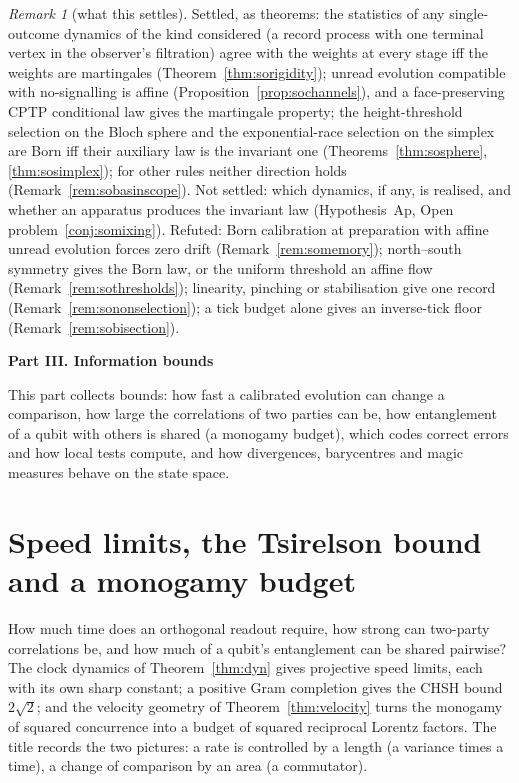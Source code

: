 \documentclass[aps,pra,onecolumn,superscriptaddress,nofootinbib,10pt]{revtex4-2}
\theoremstyle{definition}
\theoremstyle{remark}
\newtheorem{remark}[theorem]{Remark}
\newcommand{\paperpart}[1]{\par\bigskip\begin{center}\large\bfseries #1\end{center}\par\medskip}
\begin{document}
\begin{remark}[what this settles]\label{rem:sosettles}
Settled, as theorems: the statistics of any single-outcome dynamics of the kind considered (a record
process with one terminal vertex in the observer's filtration) agree with the
weights at every stage iff the weights are martingales (Theorem~\ref{thm:sorigidity}); unread evolution compatible
with no-signalling is affine (Proposition~\ref{prop:sochannels}), and a face-preserving CPTP conditional law gives the
martingale property; the height-threshold selection on the Bloch sphere and the exponential-race selection on the
simplex are Born iff their auxiliary law is the invariant one (Theorems~\ref{thm:sosphere}, \ref{thm:sosimplex}); for
other rules neither direction holds (Remark~\ref{rem:sobasinscope}).  Not settled: which dynamics, if any, is realised, and whether an apparatus produces the invariant law (Hypothesis~Ap, Open problem~\ref{conj:somixing}).
Refuted: Born calibration at preparation with affine unread evolution forces zero drift
(Remark~\ref{rem:somemory}); north--south symmetry gives the Born law, or the uniform threshold an affine flow
(Remark~\ref{rem:sothresholds}); linearity, pinching or stabilisation give one record (Remark~\ref{rem:sononselection}); a tick
budget alone gives an inverse-tick floor (Remark~\ref{rem:sobisection}).
\end{remark}


\paperpart{Part III.  Information bounds}
\noindent This part collects bounds: how fast a calibrated evolution can change a comparison, how large the
correlations of two parties can be, how entanglement of a qubit with others is shared (a monogamy budget),
which codes correct errors and how local tests compute, and how divergences, barycentres and magic measures
behave on the state space.

\section{Speed limits, the Tsirelson bound and a monogamy budget}\label{sec:bounds}
How much time does an orthogonal readout require, how strong can two-party correlations be, and how much
of a qubit's entanglement can be shared pairwise?  The clock dynamics of Theorem~\ref{thm:dyn} gives projective
speed limits, each with its own sharp constant; a positive Gram completion gives the CHSH bound $2\sqrt2$; and
the velocity geometry of Theorem~\ref{thm:velocity} turns the monogamy of squared concurrence into a budget of
squared reciprocal Lorentz factors.  The title records the two pictures: a rate is controlled by a length
(a variance times a time), a change of comparison by an area (a commutator).
\end{document}

